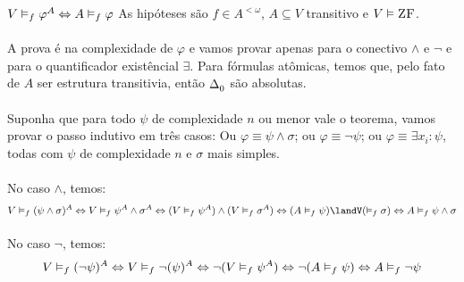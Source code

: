                 \begin{theorem}{$V\vDash_f\varphi^A\Leftrightarrow A\vDash_f\varphi$}
                    As hipóteses são $f\in A^{<\omega}$, $A\subseteq V$ transitivo e $V\vDash\text{\sc ZF}$.
                    \paragraph{}
                        A prova é na complexidade de $\varphi$ e vamos provar apenas para o conectivo $\land$ e $\neg$ e 
                        para o quantificador existêncial $\exists$. Para fórmulas atômicas, temos que, pelo fato de $A$ 
                        ser estrutura transitivia, então $\Delta^{}_{0}$ são absolutas.
                    \paragraph{}
                        Suponha que para todo $\psi$ de complexidade $n$ ou menor vale o teorema, vamos provar o passo 
                        indutivo em três casos: Ou $\varphi\equiv\psi\land\sigma$; ou $\varphi\equiv\neg\psi$; ou 
                        $\varphi\equiv\exists x_i: \psi$, todas com $\psi$ de complexidade $n$ e $\sigma$ mais simples.
                    \paragraph{}
                        No caso $\land$, temos:
                        $$ 
                             V\vDash_f (\psi\land\sigma)^A \BIM 
                             V\vDash_f \psi^A\land\sigma^A \BIM 
                            (V\vDash_f \psi^A)\land(V\vDash_f \sigma^A) \BIM 
                            (A\vDash_f \psi)\landV(\vDash_f \sigma) \BIM 
                             A\vDash_f \psi\land\sigma
                        $$
                    \paragraph{}
                        No caso $\neg$, temos:
                        $$ 
                            V\vDash_f (\neg\psi)^A \Leftrightarrow 
                            V\vDash_f \neg(\psi)^A \Leftrightarrow 
                            \neg(V\vDash_f \psi^A) \Leftrightarrow 
                            \neg(A\vDash_f \psi  ) \Leftrightarrow 
                            A\vDash_f \neg\psi
                        $$

\end{theorem}
